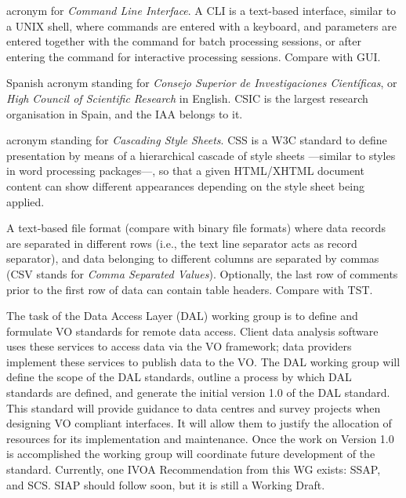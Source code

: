 {
    	acronym for \emph{Command Line Interface}. A CLI is a
        text-based interface, similar to a UNIX shell, where commands
        are entered with a keyboard, and parameters are entered
        together with the command for batch processing sessions, or
        after entering the command for interactive processing sessions.
        Compare with \gls{GUI}.
}

{
    	Spanish acronym standing for \emph{Consejo Superior de
        Investigaciones Científicas}, or \emph{High Council of
        Scientific Research} in English. CSIC is the largest research
        organisation in Spain, and the \gls{IAA} belongs to it.
}

{
    	acronym standing for \emph{Cascading Style Sheets}. CSS is a
        \gls{W3C} standard to define presentation by means of a
        hierarchical cascade of style sheets —similar to styles in word
        processing packages—, so that a given \gls{HTML}/\gls{XHTML}
        document content can show different appearances depending on
        the style sheet being applied.
}

{
    	A \gls{text-based file format} (compare with \gls{binary file
        formats}) where data records are separated in different rows
        (i.e., the text line separator acts as record separator), and
        data belonging to different columns are separated by commas
        (CSV stands for \emph{Comma Separated Values}). Optionally, the
        last row of comments prior to the first row of data can contain
        table headers. Compare with \gls{TST}.
}

{
    	The task of the Data Access Layer (DAL) working group is to
        define and formulate VO standards for remote data access.
        Client data analysis software uses these services to access
        data via the VO framework; data providers implement these
        services to publish data to the VO. The DAL working group will
        define the scope of the DAL standards, outline a process by
        which DAL standards are defined, and generate the initial
        version 1.0 of the DAL standard. This standard will provide
        guidance to data centres and survey projects when designing VO
        compliant interfaces. It will allow them to justify the
        allocation of resources for its implementation and maintenance.
        Once the work on Version 1.0 is accomplished the working group
        will coordinate future development of the standard. Currently,
        one \gls{IVOA} \gls{Recommendation} from this WG exists:
        \gls{SSAP}, and \gls{SCS}. \gls{SIAP} should follow soon, but
        it is still a \gls{Working Draft}.
}

